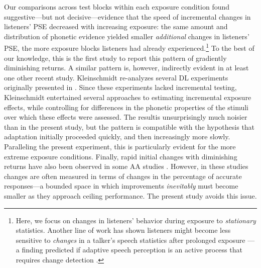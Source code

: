 \documentclass[
  11pt,
  man,mask,floatsintext]{apa6}
\begin{document}
Our comparisons across test blocks within each exposure condition found suggestive---but not decisive---evidence that the speed of incremental changes in listeners' PSE decreased with increasing exposure: the same amount and distribution of phonetic evidence yielded smaller \emph{additional} changes in listeners' PSE, the more exposure blocks listeners had already experienced.\footnote{Here, we focus on changes in listeners' behavior during exposure to \emph{stationary} statistics. Another line of work has shown listeners might become less sensitive to \emph{changes} in a talker's speech statistics after prolonged exposure \autocites[e.g.,][]{kraljic-samuel2011,saltzman-myers2021}[but see][]{theodore-monto2019}---a finding predicted if adaptive speech perception is an active process \autocite{magnuson-nusbaum2007} that requires change detection \autocite{qian2012}.} To the best of our knowledge, this is the first study to report this pattern of gradiently diminishing returns. A similar pattern is, however, indirectly evident in at least one other recent study. Kleinschmidt \autocite*[Experiment 3]{kleinschmidt2020} re-analyzes several DL experiments originally presented in \textcite{kleinschmidt-jaeger2016}. Since these experiments lacked incremental testing, Kleinschmidt entertained several approaches to estimating incremental exposure effects, while controlling for differences in the phonetic properties of the stimuli over which these effects were assessed. The resultis unsurprisingly much noisier than in the present study, but the pattern is compatible with the hypothesis that adaptation initially proceeded quickly, and then increasingly more slowly. Paralleling the present experiment, this is particularly evident for the more extreme exposure conditions. Finally, rapid initial changes with diminishing returns have also been observed in some AA studies \autocites{bieber2023}[SI \(\S3\)]{xie2021jep}. However, in these studies changes are often measured in terms of changes in the percentage of accurate responses---a bounded space in which improvements \emph{inevitably} must become smaller as they approach ceiling performance. The present study avoids this issue.
\end{document}
